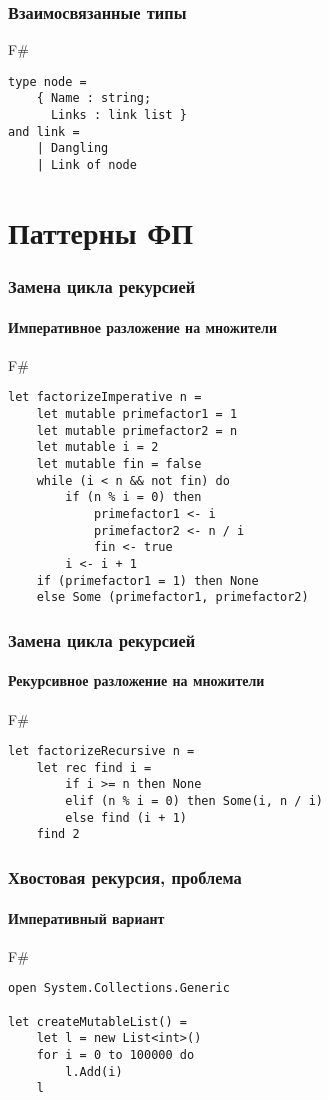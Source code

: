 \documentclass[xetex,mathserif,serif]{beamer}
\begin{document}
	\begin{frame}[fragile]
		\frametitle{Взаимосвязанные типы}
		\begin{exampleblock}{F\#}
			\begin{verbatim}
type node =
    { Name : string;
      Links : link list }
and link =
    | Dangling
    | Link of node
			\end{verbatim}
		\end{exampleblock}
\end{frame}

	\section{Паттерны ФП}

	\begin{frame}[fragile]
		\frametitle{Замена цикла рекурсией}
		\framesubtitle{Императивное разложение на множители}
		\begin{exampleblock}{F\#}
			\begin{verbatim}
let factorizeImperative n =
    let mutable primefactor1 = 1
    let mutable primefactor2 = n
    let mutable i = 2
    let mutable fin = false
    while (i < n && not fin) do
        if (n % i = 0) then
            primefactor1 <- i
            primefactor2 <- n / i
            fin <- true
        i <- i + 1
    if (primefactor1 = 1) then None
    else Some (primefactor1, primefactor2)
			\end{verbatim}
		\end{exampleblock}
\end{frame}

	\begin{frame}[fragile]
		\frametitle{Замена цикла рекурсией}
		\framesubtitle{Рекурсивное разложение на множители}
		\begin{exampleblock}{F\#}
			\begin{verbatim}
let factorizeRecursive n =
    let rec find i =
        if i >= n then None
        elif (n % i = 0) then Some(i, n / i)
        else find (i + 1)
    find 2
			\end{verbatim}
		\end{exampleblock}
\end{frame}

	\begin{frame}[fragile]
		\frametitle{Хвостовая рекурсия, проблема}
		\framesubtitle{Императивный вариант}
		\begin{exampleblock}{F\#}
			\begin{verbatim}
open System.Collections.Generic

let createMutableList() =
    let l = new List<int>()
    for i = 0 to 100000 do
        l.Add(i)
    l
			\end{verbatim}
		\end{exampleblock}
\end{frame}
\end{document}
